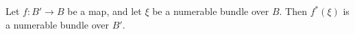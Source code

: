 Let $f: B' \rightarrow B$ be a map, and let $\xi$ be a numerable bundle over $B$. Then $f^*(\xi)$ is a numerable bundle over $B'$.
